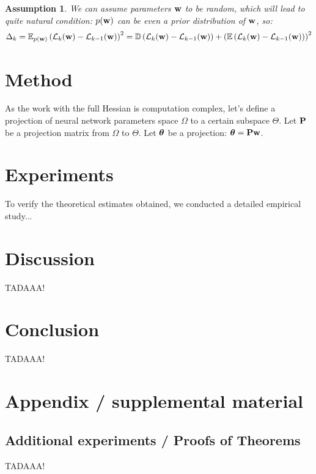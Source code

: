 \documentclass{article}
\newtheorem{assumption}{Assumption}
\begin{document}
\begin{assumption}
  We can assume parameters $\mathbf{w}$ to be random, which will lead to quite natural condition: $p(\mathbf{w})$ can be even a prior
  distribution of $\mathbf{w}$, so:
  $$\Delta_{k} = \mathbb{E}_{p(\mathbf{w})} \left( \mathcal{L}_{k}(\mathbf{w}) - \mathcal{L}_{k-1}(\mathbf{w})
    \right)^2 = \mathbb{D} \left( \mathcal{L}_{k}(\mathbf{w}) - \mathcal{L}_{k-1}(\mathbf{w}) \right) + \left( \mathbb{E} \left(
      \mathcal{L}_{k}(\mathbf{w}) - \mathcal{L}_{k-1}(\mathbf{w}) \right) \right)^2$$
\end{assumption}

\section{Method}\label{sec:method}

As the work with the full Hessian is computation complex, let's define a projection of neural network parameters space
$\Omega$ to a certain subspace $\Theta$. Let $\mathbf{P}$ be a projection matrix from $\Omega$ to $\Theta$. Let $\boldsymbol{\theta}$ be
a projection: $\boldsymbol{\theta} = \mathbf{P}\mathbf{w}$.

\section{Experiments}\label{sec:exp}

To verify the theoretical estimates obtained, we conducted a detailed empirical study...

\section{Discussion}\label{sec:disc}

TADAAA!

\section{Conclusion}\label{sec:concl}

TADAAA!







\newpage
\appendix
\section{Appendix / supplemental material}\label{app}

\subsection{Additional experiments / Proofs of Theorems}\label{app:exp}

TADAAA!
\end{document}
